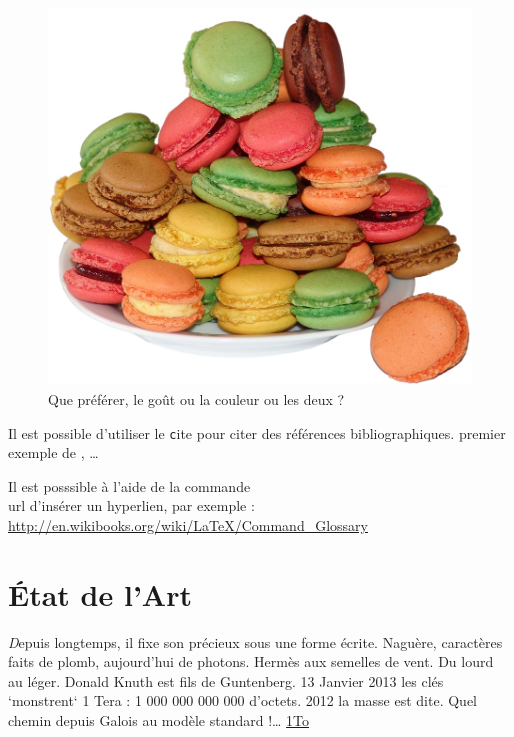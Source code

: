 \documentclass[twocolumn,a4paper]{IEEEtranfr}
\begin{document}
\begin{figure}[htpb]
  \begin{center}
    \includegraphics[width=\columnwidth] {gouts.jpg}
  \end{center}
  \caption{Que préférer, le goût ou la couleur ou les deux ?  }
  \label{fig:fondforme}
\end{figure}

Il est possible d'utiliser le {\texttt cite} pour citer des références
bibliographiques. 
premier exemple de \cite{akgu07},\cite{akgu091}\cite{zwic00} \ldots

Il est posssible à l'aide de la commande {\texttt \\url{}} d'insérer un
hyperlien, par exemple : \url{http://en.wikibooks.org/wiki/LaTeX/Command_Glossary}

\section{État de l'Art} 

{\tiny \textit
Depuis longtemps, il fixe son précieux sous une forme écrite.
Naguère, caractères faits de plomb, aujourd'hui de photons. Hermès aux semelles de vent. Du lourd au léger.  
Donald Knuth est fils de Guntenberg. 13 Janvier 2013 les clés `monstrent`  1 Tera : 1 000 000 000 000 d'octets. 
2012 la masse est dite. Quel chemin depuis Galois au modèle standard !\dots
}
\href{http://micro.lemondeinformatique.fr/nouveaux-produits/lire-datatraveler-hyperx-predator-19600.html}{1To}
\end{document}
